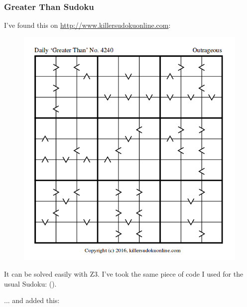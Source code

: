 \subsubsection{Greater Than Sudoku}

I've found this on \url{http://www.killersudokuonline.com}:

\begin{figure}[H]
\centering
\includegraphics[scale=0.6]{puzzles/sudoku/GT/puzzle.png}
\caption{}
\end{figure}

It can be solved easily with Z3. I've took the same piece of code I used for the usual Sudoku: ().

... and added this:

